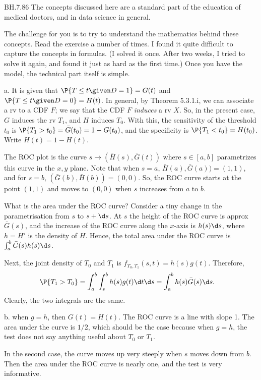 
\setcounter{theorem}{85}
\begin{exercise}BH.7.86
The concepts discussed here are a standard part of the education of medical doctors, and in data science in general.
\begin{hint}
The challenge for you is to try to understand the mathematics behind these concepts.
Read the exercise a number of times. I found it quite difficult to capture the concepts in formulas. (I solved it once. After two weeks,  I tried to solve it again, and found it just as hard as the first time.) Once you have the model, the technical part itself is simple.
\end{hint}
\begin{solution}
a.
It is given that $\P{T\leq t\given D=1} = G(t)$ and $\P{T\leq t\given D=0} = H(t)$.
In general, by Theorem 5.3.1.i, we can associate a rv to a CDF $F$; we say that the CDF $F$ \emph{induces} a rv $X$.
So, in the present case,   $G$ induces the rv $T_1$, and $H$ induces $T_0$.
With this, the sensitivity of the threshold $t_{0}$ is $\P{T_1>t_0} = \bar G(t_{0}) = 1-G(t_0)$, and the specificity is $\P{T_1<t_0} = H(t_0)$. Write $\bar H(t) = 1- H(t)$.

The ROC plot is the curve $s\to (\bar H(s), \bar G(t))$ where $s\in [a, b]$ parametrizes this curve in the $x,y$ plane.
Note that when $s=a$, $\bar H(a), \bar G(a)) = (1,1)$, and for $s=b$, $(\bar G(b), \bar H(b)) = (0,0)$.
So, the ROC curve starts at the point $(1,1)$ and moves to $(0,0)$ when $s$ increases from $a$ to $b$.

What is the area under the ROC curve?
Consider a tiny change in the parametrisation from $s$ to $s + \d s$.
At $s$ the height of the ROC curve is approx $\bar G(s)$, and the increase of the ROC curve along the $x$-axis is $h(s) \d s$, where $h = H'$ is the density of $H$.
Hence, the total area under the ROC curve is $\int_{a}^{b} \bar G(s) h(s) \d s$.

Next, the joint density of $T_{0}$ and $T_{1}$ is $f_{T_{0}, T_{1}}(s, t) = h(s) g(t)$. Therefore,
\begin{align*}
  \P{T_{1} > T_{0}}
  &= \int_{a}^{b}\int_s^{b} h(s) g(t) \d t \d s = \int_a^{b} h(s) \bar G(s) \d s.
\end{align*}
Clearly, the two integrals are the same.

b. when $g=h$, then $G(t)=H(t)$. The ROC curve is a line with slope 1. The area under the curve is $1/2$, which should be the case because when $g=h$, the test does not say anything useful about $T_{0}$ or $T_{1}$.

In the second case, the curve moves up very steeply when $s$ moves down from $b$.
Then the area under the ROC curve is nearly one, and the test is very informative.
\end{solution}
\end{exercise}

